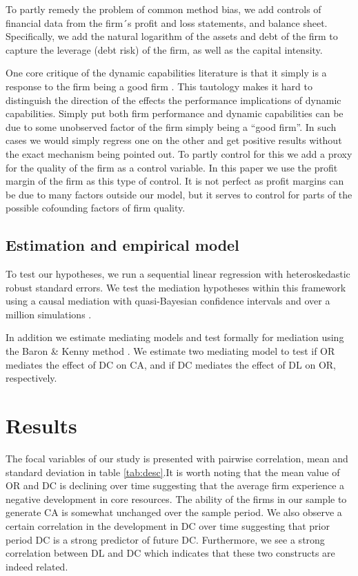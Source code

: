 \documentclass[review,fleqn]{elsarticle}\usepackage[]{graphicx}\usepackage[]{color}
\begin{document}
To partly remedy the problem of common method bias, we add controls of financial data from
the firm´s profit and loss statements, and balance sheet. Specifically, we add the natural
logarithm of the assets and debt of the firm to capture the leverage (debt risk) of the
firm, as well as the capital intensity.

One core critique of the dynamic capabilities literature is that it simply is a response
to the firm being a good firm \citep{Arend2009}. This tautology makes it hard to
distinguish the direction of the effects the performance implications of dynamic
capabilities. Simply put both firm performance and dynamic capabilities can be due to some
unobserved factor of the firm simply being a “good firm”. In such cases we would simply
regress one on the other and get positive results without the exact mechanism being
pointed out. To partly control for this we add a proxy for the quality of the firm as a
control variable. In this paper we use the profit margin of the firm as this type of
control. It is not perfect as profit margins can be due to many factors outside our model,
but it serves to control for parts of the possible cofounding factors of firm quality.

\subsection{Estimation and empirical model}

To test our hypotheses, we run a sequential linear regression with heteroskedastic robust
standard errors. We test the mediation hypotheses within this framework using a causal
mediation \citep{Baron1986,MacKinnon2008} with quasi-Bayesian confidence intervals and
over a million simulations \citep{Imai2010}.

In addition we estimate mediating models and test formally for mediation using the Baron
\& Kenny method \citep{Baron1986,MacKinnon2008}. We estimate two mediating model to test
if OR mediates the effect of DC on CA, and if DC mediates the effect of DL on OR,
respectively.

\section{Results}
The focal variables of our study is presented with pairwise correlation, mean and standard
deviation in table \ref{tab:desc}.It is worth noting that the mean value of OR and DC is
declining over time suggesting that the average firm experience a negative development in
core resources. The ability of the firms in our sample to generate CA is somewhat
unchanged over the sample period. We also observe a certain correlation in the development
in DC over time suggesting that prior period DC is a strong predictor of future
DC. Furthermore, we see a strong correlation between DL and DC which indicates that these
two constructs are indeed related.
\end{document}
